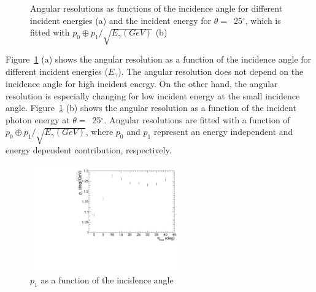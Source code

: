 \documentclass[preprint,12pt,times,a4paper]{elsarticle}
\begin{document}
\begin{figure}[!hbt]
\centering
{}
\caption{ Angular resolutions as functions of the incidence angle for different incident energies (a) and the incident energy for $\theta=$~25$^{\circ}$, which is fitted with $p_{0} \oplus p_{1}/\sqrt{E_{\gamma}(GeV)}$ (b) }
\label{fig:angle_reco_dep_gr}
\end{figure}

Figure~\ref{fig:angle_reco_dep_gr} (a) shows the angular resolution as a function of the incidence angle for different incident energies ($E_{\gamma}$). The angular resolution does not depend on the incidence angle for high incident energy. On the other hand, the angular resolution is especially changing for low incident energy at the small incidence angle. Figure~\ref{fig:angle_reco_dep_gr} (b) shows the angular resolution as a function of the incident photon energy at $\theta=$~25$^{\circ}$. Angular resolutions are fitted with a function of $p_{0} \oplus p_{1}/\sqrt{E_{\gamma}(GeV)}$, where $p_{0}$ and $p_{1}$ represent an energy independent and energy dependent contribution, respectively.

\begin{figure}[!hbt]
\centering
\includegraphics[width=0.58\textwidth]{figures/Fig7_p1.pdf}
\caption{ $p_{1}$ as a function of the incidence angle }
\label{fig:res_edep}
\end{figure}
\end{document}

